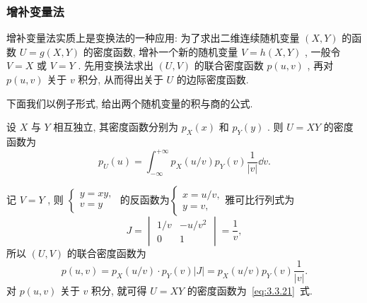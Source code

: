         \subsubsection{增补变量法}
        增补变量法实质上是变换法的一种应用: 为了求出二维连续随机变量 $(X,Y)$ 的函数 $U=g(X,Y)$ 的密度函数, 增补一个新的随机变量 $V=h(X,Y)$ , 一般令 $V=X$ 或 $V=Y$ . 先用变换法求出 $(U,V)$ 的联合密度函数 $p(u,v)$ , 再对 $p(u,v)$ 关于 $v$ 积分, 从而得出关于 $U$ 的边际密度函数.
        
        下面我们以例子形式, 给出两个随机变量的积与商的公式.
      \begin{example}[(积的公式)]\label{exam:3.3.10}
      	设 $X$ 与 $Y$ 相互独立, 其密度函数分别为 $p_{X}(x)$ 和 $p_{Y}(y)$ . 则 $U=XY$ 的密度函数为
      	\begin{equation}\label{eq:3.3.21}
      		p_{U}(u)=\int_{-\infty}^{+\infty}p_{X}(u/v)p_{Y}(v)\frac{1}{|v|}\dd v.
      	\end{equation}
      	\begin{solution}
      		记 $V=Y$ , 则 $\begin{cases}
      		y=xy,\\
      		v=y
      		\end{cases}$ 的反函数为$\begin{cases}
      		x=u/v,\\
      		y=v,
      		\end{cases}$雅可比行列式为
      		\begin{equation*}
      			J=\begin{vmatrix}
      			1/v & -u/v^2\\
      			0 & 1
      			\end{vmatrix}=\frac{1}{v},
      		\end{equation*}
      		所以 $(U,V)$ 的联合密度函数为
      		\begin{equation*}
      			p(u,v)=p_{X}(u/v)\cdot p_{Y}(v)|J|=p_{X}(u/v)p_{Y}(v)\frac{1}{|v|}.
      		\end{equation*}
      		对 $p(u,v)$ 关于 $v$ 积分, 就可得 $U=XY$ 的密度函数为~\eqref{eq:3.3.21}~式.
      	\end{solution}
      \end{example}
